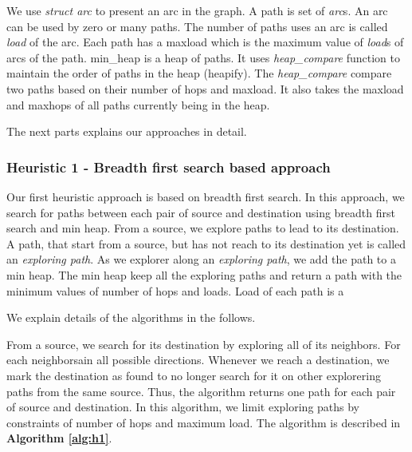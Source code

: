We use \textit{struct arc} to present an arc in the graph. A path is set of \textit{arc}s. An arc can be used by zero or many paths. The number of paths uses an arc is called \textit{load} of the arc. Each path has a maxload which is the maximum value of \textit{load}s of arcs of the path. {min\_heap} is a heap of paths. It uses \textit{heap\_compare} function to maintain the order of paths in the heap (heapify). The \textit{heap\_compare} compare two paths based on their number of hops and maxload. It also takes the maxload and maxhops of all paths currently being in the heap. 

The next parts explains our approaches in detail.

\subsubsection{Heuristic 1 - Breadth first search based approach}

Our first heuristic approach is based on breadth first search. In this approach, we search for paths between each pair of source and destination using breadth first search and min heap. From a source, we explore paths to lead to its destination. A path, that start from a source, but has not reach to its destination yet is called an \textit{exploring path}. As we explorer along an \textit{exploring path}, we add the path to a min heap. The min heap keep all the exploring paths and return a path with the minimum values of number of hops and loads. Load of each path is a 

We explain details of the algorithms in the follows.

From a source, we search for its destination by exploring all of its neighbors. For each neighborsain all possible directions.  Whenever we reach a destination, we mark the destination as found to no longer search for it on other explorering paths from the same source. Thus, the algorithm returns one path for each pair of source and destination. In this algorithm, we limit exploring paths by constraints of number of hops and maximum load. The algorithm is described in \textbf{Algorithm \ref{alg:h1}}.

